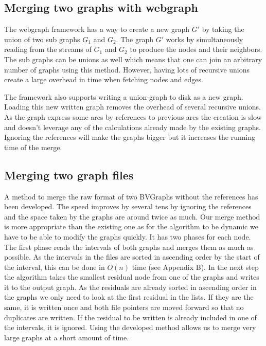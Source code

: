 \subsection{Merging two graphs with webgraph}

The webgraph framework has a way to create a new graph $G'$ by taking the union of two sub graphs $G_1$ and $G_2$. The graph $G'$ works by simultaneously reading from the streams of $G_1$ and $G_2$ to produce the nodes and their neighbors. The sub graphs can be unions as well which means that one can join an arbitrary number of graphs using this method. However, having lots of recursive unions create a large overhead in time when fetching nodes and edges. \cite{webgraph} 

The framework also supports writing a union-graph to disk as a new graph. Loading this new written graph removes the overhead of several recursive unions. As the graph express some arcs by references to previous arcs the creation is slow and doesn't leverage any of the calculations already made by the existing graphs. Ignoring the references will make the graphs bigger but it increases the running time of the merge. 

\subsection{Merging two graph files}
A method to merge the raw format of two BVGraphs without the references has been developed. The speed improves by several tens by ignoring the references and the space taken by the graphs are around twice as much. Our merge method is more appropriate than the existing one as for the algorithm to be dynamic we have to be able to modify the graphs quickly. It has two phases for each node. The first phase reads the intervals of both graphs and merges them as much as possible. As the intervals in the files are sorted in ascending order by the start of the interval, this can be done in $O(n)$ time (see Appendix B). In the next step the algorithm takes the smallest residual node from one of the graphs and writes it to the output graph. As the residuals are already sorted in ascending order in the graphs we only need to look at the first residual in the lists. If they are the same, it is written once and both file pointers are moved forward so that no duplicates are written. If the residual to be written is already included in one of the intervals, it is ignored. Using the developed method allows us to merge very large graphs at a short amount of time.

